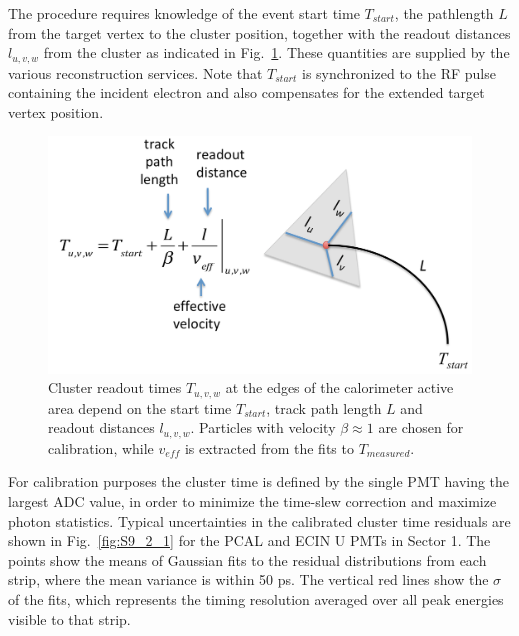 The procedure requires knowledge of the event start time $T_{start}$, the pathlength $L$ from the target vertex to the cluster position, together with the readout distances $l_{u,v,w}$ from the cluster as indicated in Fig.~\ref{fig:S9_2_0}.  These quantities are supplied by the various reconstruction services.  Note that $T_{start}$ is synchronized to the RF pulse containing the incident electron and also compensates for the extended target vertex position.

\begin{figure}[hbt]
\centering
\includegraphics[width=1.0\columnwidth,keepaspectratio]{img/S9_2_0.png}
\caption[]{Cluster readout times $T_{u,v,w}$ at the edges of the calorimeter active area depend on the start time $T_{start}$, track path length $L$ and readout distances $l_{u,v,w}$.  Particles with velocity $\beta\approx 1$ are chosen for calibration, while $v_{eff}$ is extracted from the fits to $T_{measured}$.}
\label{fig:S9_2_0}
\end{figure}

For calibration purposes the cluster time is defined by the single PMT having the largest ADC value, in order to minimize the time-slew correction and maximize photon statistics.  Typical uncertainties in the calibrated cluster time residuals are shown in Fig.~\ref{fig:S9_2_1} for the PCAL and ECIN U PMTs in Sector 1.  The points show the means of Gaussian fits to the residual distributions from each strip, where the mean variance is within 50 ps.  The vertical red lines show the $\sigma$ of the fits, which represents the timing resolution averaged over all peak energies visible to that strip.  

